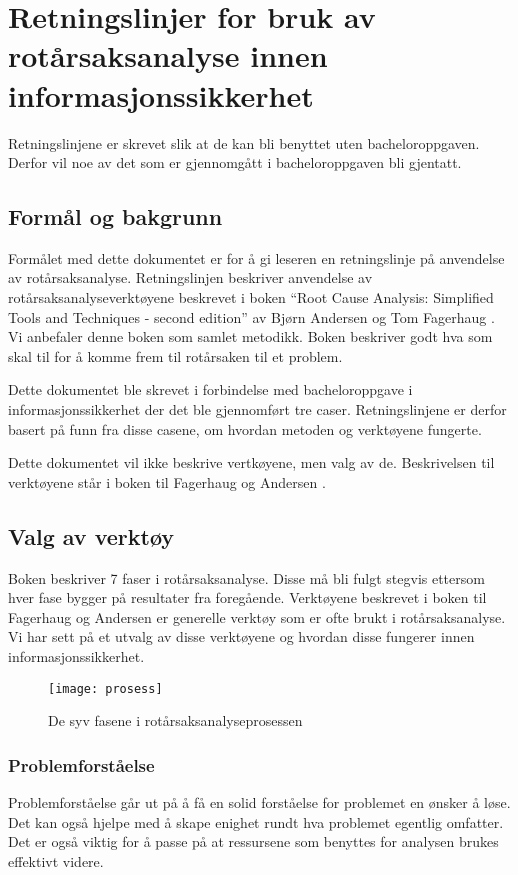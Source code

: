 \chapter{Retningslinjer for bruk av rotårsaksanalyse innen informasjonssikkerhet}
\label{kap:retningslinjer-RCA}
Retningslinjene er skrevet slik at de kan bli benyttet uten bacheloroppgaven. Derfor vil noe av det som er gjennomgått i bacheloroppgaven bli gjentatt.

\section{Formål og bakgrunn}
Formålet med dette dokumentet er for å gi leseren en retningslinje på anvendelse av rotårsaksanalyse. Retningslinjen beskriver anvendelse av rotårsaksanalyseverktøyene beskrevet i boken ``Root Cause Analysis: Simplified Tools and Techniques - second edition'' av Bjørn Andersen og Tom Fagerhaug \cite{RCA}. Vi anbefaler denne boken som samlet metodikk. Boken beskriver godt hva som skal til for å komme frem til rotårsaken til et problem. 

Dette dokumentet ble skrevet i forbindelse med bacheloroppgave i informasjonssikkerhet der det ble gjennomført tre caser. Retningslinjene er derfor basert på funn fra disse casene, om hvordan metoden og verktøyene fungerte.

Dette dokumentet vil ikke beskrive vertkøyene, men valg av de. Beskrivelsen til verktøyene står i boken til Fagerhaug og Andersen \cite{RCA}.

\section{Valg av verktøy}
Boken beskriver 7 faser i rotårsaksanalyse. Disse må bli fulgt stegvis ettersom hver fase bygger på resultater fra foregående. Verktøyene beskrevet i boken til Fagerhaug og Andersen \cite{RCA} er generelle verktøy som er ofte brukt i rotårsaksanalyse. Vi har sett på et utvalg av disse verktøyene og hvordan disse fungerer innen informasjonssikkerhet. 

\begin{figure}[H]
    \centering
    \texttt{[image: prosess]}
    \caption[RCA-prosess]{De syv fasene i rotårsaksanalyseprosessen}
    \label{fig:prosess}
\end{figure}
\subsection{Problemforståelse}
Problemforståelse går ut på å få en solid forståelse for problemet en ønsker å løse. Det kan også hjelpe med å skape enighet rundt hva problemet egentlig omfatter. Det er også viktig for å passe på at ressursene som benyttes for analysen brukes effektivt videre. 

